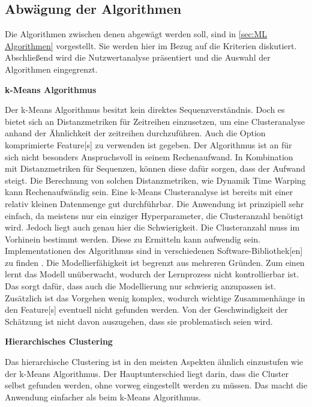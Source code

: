 \subsection{Abwägung der Algorithmen}
Die Algorithmen zwischen denen abgewägt werden soll, sind in \autoref{sec:ML Algorithmen} vorgestellt. Sie werden hier im Bezug auf die Kriterien diskutiert. Abschließend wird die Nutzwertanalyse präsentiert und die Auswahl der Algorithmen eingegrenzt. \dubpar

\textbf{k-Means Algorithmus}\par
Der k-Means Algorithmus besitzt kein direktes Sequenzverständnis. Doch es bietet sich an Distanzmetriken für Zeitreihen einzusetzen, um eine Clusteranalyse anhand der Ähnlichkeit der zeitreihen durchzuführen. Auch die Option komprimierte \gls{Feature}[s] zu verwenden ist gegeben. Der Algorithmus ist an für sich nicht besonders Anspruchsvoll in seinem Rechenaufwand. In Kombination mit Distanzmetriken für Sequenzen, können diese dafür sorgen, dass der Aufwand steigt. Die Berechnung von solchen Distanzmetriken, wie Dynamik Time Warping kann Rechenaufwändig sein. Eine k-Means Clusteranalyse ist bereits mit einer relativ kleinen Datenmenge gut durchführbar. Die Anwendung ist prinzipiell sehr einfach, da meistens nur ein einziger \gls{Hyperparameter}, die Clusteranzahl benötigt wird. Jedoch liegt auch genau hier die Schwierigkeit. Die Clusteranzahl muss im Vorhinein bestimmt werden. Diese zu Ermitteln kann aufwendig sein. Implementationen des Algorithmus sind in verschiedenen Software-\gls{Bibliothek}[en] zu finden \cite{FabianPedregosa.2011}. Die Modellierfähigkeit ist begrenzt aus mehreren Gründen. Zum einen lernt das Modell unüberwacht, wodurch der Lernprozess nicht kontrollierbar ist. Das sorgt dafür, dass auch die Modellierung nur schwierig anzupassen ist. Zusätzlich ist das Vorgehen wenig komplex, wodurch wichtige Zusammenhänge in den \gls{Feature}[s] eventuell nicht gefunden werden. Von der Geschwindigkeit der Schätzung ist nicht davon auszugehen, dass sie problematisch seien wird.\dubpar

\textbf{Hierarchisches Clustering}\par
Das hierarchische Clustering ist in den meisten Aspekten ähnlich einzustufen wie der k-Means Algorithmus. Der Hauptunterschied liegt darin, dass die Cluster selbst gefunden werden, ohne vorweg eingestellt werden zu müssen. Das macht die Anwendung einfacher als beim k-Means Algorithmus.\dubpar


